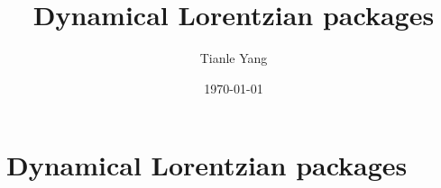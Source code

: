 \documentclass[sectionlevel=section,status=draft]{noteformyself}
\title{Dynamical Lorentzian packages}
\author{Tianle Yang}
\date{\today}
\begin{document}
    \maketitle

    \section[
      status=draft,
      tag=00000,
      label=\labelNFM{sec:actions-on-cohomology:dynamical-lorentzian-packages}
    ]{Dynamical Lorentzian packages}

    

\end{document}

